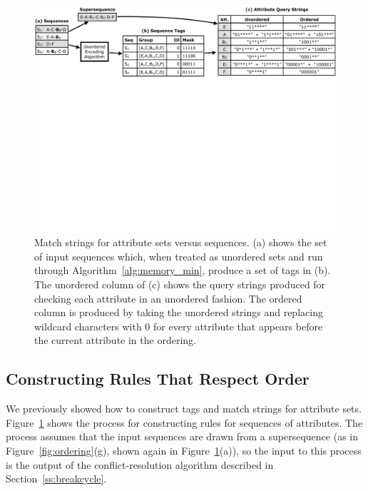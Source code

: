 \begin{figure}[t!]
\includegraphics[trim={0 18cm 0 0}, clip, width=\textwidth]{figures/ordered_match_strings}
\caption{Match strings for attribute sets versus sequences. (a) shows the set of input sequences which, when treated as unordered sets and run through Algorithm~\ref{alg:memory_min}, produce a set of tags in (b). The unordered column of (c) shows the query strings produced for checking each attribute in an unordered fashion. The ordered column is produced by taking the unordered strings and replacing wildcard characters with 0 for every attribute that appears before the current attribute in the ordering.}
\label{fig:ordered_rules}
\end{figure}


\subsection{Constructing Rules That Respect Order}
\label{s:order-rules}

We previously showed how to construct tags and match strings for attribute {sets}. Figure~\ref{fig:ordered_rules} shows the process for constructing rules for {sequences} of attributes. The process assumes that the input sequences are drawn from a supersequence (as in Figure~\ref{fig:ordering}(g), shown again in Figure~\ref{fig:ordered_rules}(a)), so the input to this process is the output of the conflict-resolution algorithm described in Section~\ref{ss:breakcycle}.

